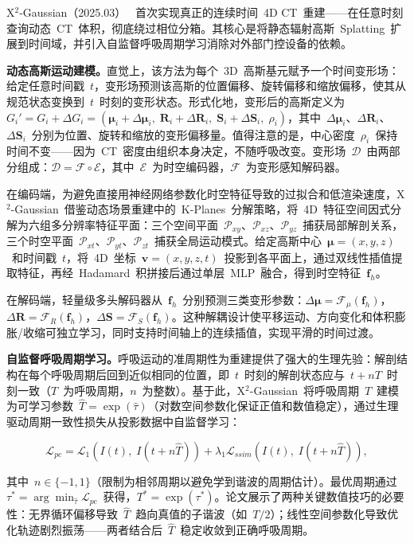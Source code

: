 X$^{2}$-Gaussian（2025.03）~\cite{2503_21779} 首次实现真正的连续时间~4D CT~重建——在任意时刻查询动态~CT~体积，彻底绕过相位分箱。其核心是将静态辐射高斯~Splatting~扩展到时间域，并引入自监督呼吸周期学习消除对外部门控设备的依赖。

\textbf{动态高斯运动建模。}直觉上，该方法为每个~3D~高斯基元赋予一个时间变形场：给定任意时间戳~$t$，变形场预测该高斯的位置偏移、旋转偏移和缩放偏移，使其从规范状态变换到~$t$~时刻的变形状态。形式化地，变形后的高斯定义为~$G_i' = G_i + \Delta G_i = (\bm{\mu}_i + \Delta\bm{\mu}_i,\; \bm{R}_i + \Delta\bm{R}_i,\; \bm{S}_i + \Delta\bm{S}_i,\; \rho_i)$，其中~$\Delta\bm{\mu}_i$、$\Delta\bm{R}_i$、$\Delta\bm{S}_i$~分别为位置、旋转和缩放的变形偏移量。值得注意的是，中心密度~$\rho_i$~保持时间不变——因为~CT~密度由组织本身决定，不随呼吸改变。变形场~$\mathcal{D}$~由两部分组成：$\mathcal{D} = \mathcal{F} \circ \mathcal{E}$，其中~$\mathcal{E}$~为时空编码器，$\mathcal{F}$~为变形感知解码器。

在编码端，为避免直接用神经网络参数化时空特征导致的过拟合和低渲染速度，X$^{2}$-Gaussian~借鉴动态场景重建中的~K-Planes~分解策略，将~4D~特征空间因式分解为六组多分辨率特征平面：三个空间平面~$\mathcal{P}_{xy}$、$\mathcal{P}_{xz}$、$\mathcal{P}_{yz}$~捕获局部解剖关系，三个时空平面~$\mathcal{P}_{xt}$、$\mathcal{P}_{yt}$、$\mathcal{P}_{zt}$~捕获全局运动模式。给定高斯中心~$\bm{\mu}=(x,y,z)$~和时间戳~$t$，将~4D~坐标~$\bm{v}=(x,y,z,t)$~投影到各平面上，通过双线性插值提取特征，再经~Hadamard~积拼接后通过单层~MLP~融合，得到时空特征~$\bm{f}_h$。

在解码端，轻量级多头解码器从~$\bm{f}_h$~分别预测三类变形参数：$\Delta\bm{\mu} = \mathcal{F}_\mu(\bm{f}_h)$，$\Delta\bm{R} = \mathcal{F}_R(\bm{f}_h)$，$\Delta\bm{S} = \mathcal{F}_S(\bm{f}_h)$。这种解耦设计使平移运动、方向变化和体积膨胀/收缩可独立学习，同时支持时间轴上的连续插值，实现平滑的时间过渡。

\textbf{自监督呼吸周期学习。}呼吸运动的准周期性为重建提供了强大的生理先验：解剖结构在每个呼吸周期后回到近似相同的位置，即~$t$~时刻的解剖状态应与~$t + nT$~时刻一致（$T$~为呼吸周期，$n$~为整数）。基于此，X$^{2}$-Gaussian~将呼吸周期~$T$~建模为可学习参数~$\hat{T} = \exp(\hat{\tau})$（对数空间参数化保证正值和数值稳定），通过生理驱动周期一致性损失从投影数据中自监督学习：

\begin{equation}
\mathcal{L}_{pc} = \mathcal{L}_1(I(t),\; I(t + n\hat{T})) + \lambda_1 \mathcal{L}_{ssim}(I(t),\; I(t + n\hat{T})),
\end{equation}

其中~$n \in \{-1, 1\}$（限制为相邻周期以避免学到谐波的周期估计）。最优周期通过~$\tau^* = \arg\min_{\hat{\tau}} \mathcal{L}_{pc}$~获得，$T^* = \exp(\tau^*)$。论文展示了两种关键数值技巧的必要性：无界循环偏移导致~$\hat{T}$~趋向真值的子谐波（如~$T/2$）；线性空间参数化导致优化轨迹剧烈振荡——两者结合后~$\hat{T}$~稳定收敛到正确呼吸周期。

